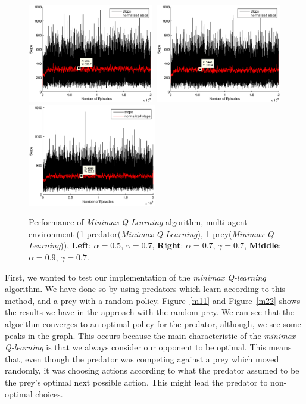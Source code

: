 \documentclass[a4paper,11pt]{article}
\begin{document}
\begin{figure}[h]
\begin{center}
    \includegraphics[width=0.49\textwidth]{figures/mm05.eps}\	
    \includegraphics[width=0.49\textwidth]{figures/mm07.eps}\\
    \includegraphics[width=0.5\textwidth]{figures/mm09.eps}
    \caption{Performance of  \textit{Minimax Q-Learning} algorithm, multi-agent environment (1 predator(\textit{Minimax Q-Learning}), 1 prey(\textit{Minimax Q-Learning})), \textbf{Left}: $\alpha = 0.5$, $\gamma = 0.7$, \textbf{Right}: $\alpha = 0.7$, $\gamma = 0.7$, \textbf{Middle}: $\alpha = 0.9$, $\gamma = 0.7$.}
    \label{m13}
\end{center}
\end{figure}

First, we wanted to test our implementation of the \textit{minimax Q-learning} algorithm. We have done so by using predators which learn according to this method, and a prey with a random policy. Figure~\ref{m11} and Figure~\ref{m22} shows the results we have in the approach with the random prey. We can see that the algorithm converges to an optimal policy for the predator,%
although, we see some peaks in the graph. This occurs because the main characteristic of the \textit{minimax Q-learning} is that we always consider our opponent to be optimal. This means that, even though the predator was competing against a prey which moved randomly, it was choosing actions according to what the predator assumed to be the prey's optimal next possible action. This might lead the predator to non-optimal choices.
\end{document}

